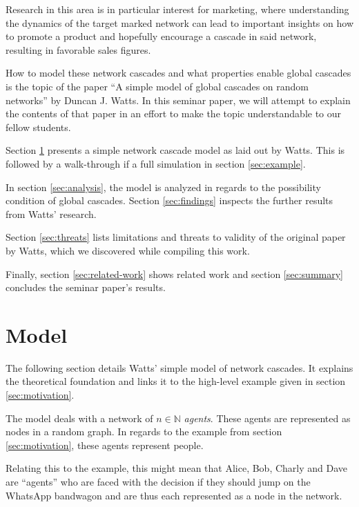 \documentclass{sig-alternate-05-2015}
\begin{document}
Research in this area is in particular interest for marketing, where understanding the dynamics of the target marked network can lead to important insights on how to promote a product and hopefully encourage a cascade in said network, resulting in favorable sales figures.

How to model these network cascades and what properties enable global cascades is the topic of the paper ``A simple model of global cascades on random networks'' by Duncan J. Watts\cite{simplemodel}. In this seminar paper, we will attempt to explain the contents of that paper in an effort to make the topic understandable to our fellow students.


\par\bigskip

Section \ref{sec:model} presents a simple network cascade model as laid out by Watts\cite{simplemodel}. This is followed by a walk-through if a full simulation in section \ref{sec:example}.

In section \ref{sec:analysis}, the model is analyzed in regards to the possibility condition of global cascades. Section \ref{sec:findings} inspects the further results from Watts' research.

Section \ref{sec:threats} lists limitations and threats to validity of the original paper by Watts, which we discovered while compiling this work.

Finally, section \ref{sec:related-work} shows related work and section \ref{sec:summary} concludes the seminar paper's results.


\section{Model}\label{sec:model}

The following section details Watts' simple model of network cascades\cite{simplemodel}. It explains the theoretical foundation and links it to the high-level example given in section \ref{sec:motivation}.

The model deals with a network of $n \in \mathbb{N}$ \emph{agents}. These agents are represented as nodes in a random graph. In regards to the example from section \ref{sec:motivation}, these agents represent people.

Relating this to the example, this might mean that Alice, Bob, Charly and Dave are ``agents'' who are faced with the decision if they should jump on the WhatsApp bandwagon and are thus each represented as a node in the network.
\end{document}

